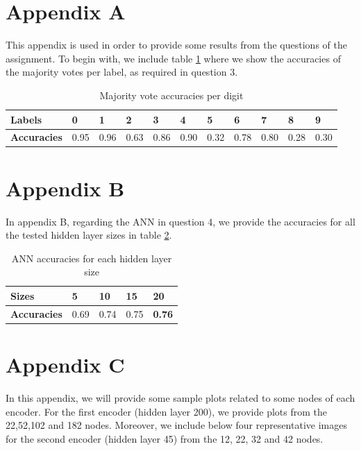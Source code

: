\documentclass[12pt]{article}
\begin{document}
	\begin{appendices}
		
		\section{Appendix A}
		\label{appendix1}
		This appendix is used in order to provide some results from the questions of the assignment. To begin with, we include table \ref{majoritylbl} where we show the accuracies of the majority votes per label, as required in question 3.
		
		\begin{table}[H]
			\centering
			\begin{tabular}{|l|l|l|l|l|l|l|l|l|l|l|}
				\hline
				\textbf{Labels}     & \textbf{0} & \textbf{1} & \textbf{2} & \textbf{3} & \textbf{4} & \textbf{5} & \textbf{6} & \textbf{7} & \textbf{8} & \textbf{9} \\ \hline
				\textbf{Accuracies} & 0.95        & 0.96       & 0.63       & 0.86       & 0.90        & 0.32       & 0.78        & 0.80        & 0.28        & 0.30       \\ \hline
			\end{tabular}
			\caption{Majority vote accuracies per digit}
			\label{majoritylbl}
		\end{table}
		
		\section{Appendix B}
		\label{appendix2}
		In appendix B, regarding the ANN in question 4, we provide the accuracies for all the tested hidden layer sizes in table \ref{annacc}.
		
		\begin{table}[H]
			\centering
			\begin{tabular}{|l|l|l|l|l|}
				\hline
				\textbf{Sizes}      & \textbf{5} & \textbf{10} & \textbf{15} & \textbf{20} \\ \hline
				\textbf{Accuracies} & 0.69       & 0.74        & 0.75        & \textbf{0.76}       \\ \hline
			\end{tabular}
			\caption{ANN accuracies for each hidden layer size}
			\label{annacc}
		\end{table}
		
		\section{Appendix C}
		\label{appendix3}
		In this appendix, we will provide some sample plots related to some nodes of each encoder. For the first encoder (hidden layer 200), we provide plots from the 22,52,102 and 182 nodes. Moreover, we include below four representative images for the second encoder (hidden layer 45) from the 12, 22, 32 and 42 nodes.
		

\end{appendices}
\end{document}
